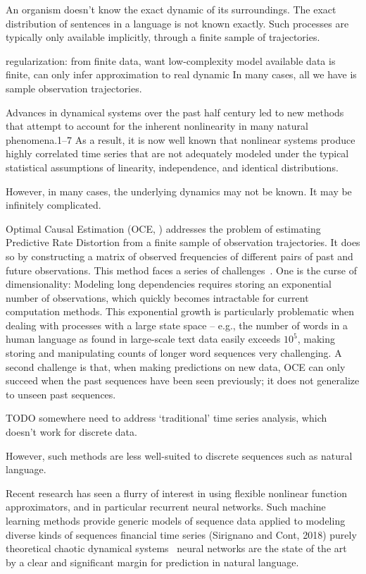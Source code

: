 \documentclass[11pt,letterpaper]{article}
\begin{document}
An organism doesn't know the exact dynamic of its surroundings.
The exact distribution of sentences in a language is not known exactly.
Such processes are typically only available implicitly, through a finite sample of trajectories.



regularization: from finite data, want low-complexity model
available data is finite, can only infer approximation to real dynamic
In many cases, all we have is sample observation trajectories.



Advances in dynamical systems over the past half century led to new methods that attempt to account for the inherent nonlinearity in many natural phenomena.1–7
As a result, it is now well known that nonlinear systems produce highly correlated time series that are not adequately modeled under the typical statistical assumptions of linearity, independence, and identical distributions.



However, in many cases, the underlying dynamics may not be known.
It may be infinitely complicated.


Optimal Causal Estimation (OCE, \citet{still-optimal-2010}) addresses the problem of estimating Predictive Rate Distortion from a finite sample of observation trajectories.
It does so by constructing a matrix of observed frequencies of different pairs of past and future observations.
This method faces a series of challenges~\citep{marzen-predictive-2016}.
One is the curse of dimensionality:
Modeling long dependencies requires storing an exponential number of observations, which quickly becomes intractable for current computation methods.
This exponential growth is particularly problematic when dealing with processes with a large state space -- e.g., the number of words in a human language as found in large-scale text data easily exceeds $10^5$, making storing and manipulating counts of longer word sequences very challenging.
A second challenge is that, when making predictions on new data, OCE can only succeed when the past sequences have been seen previously; it does not generalize to unseen past sequences.



TODO somewhere need to address `traditional' time series analysis, which doesn't work for discrete data.

However, such methods are less well-suited to discrete sequences such as natural language.

Recent research has seen a flurry of interest in using flexible nonlinear function approximators, and in particular recurrent neural networks.
Such machine learning methods provide generic models of sequence data
applied to modeling diverse kinds of sequences
financial time series (Sirignano and Cont, 2018)
purely theoretical chaotic dynamical systems~\citep{ogunmolu2016nonlinear,laptev2017time,zhu2017deep,meyer2018survey,hundman2018detecting,white2018forecasting,woo2018dynamic,mohajerin2019multistep,hagge2017solving,sirignano2018universal}
neural networks are the state of the art by a clear and significant margin for prediction in natural language.
\end{document}
